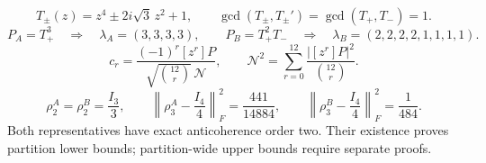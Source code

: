 \[
T_\pm(z)=z^4\pm2i\sqrt3\,z^2+1,
\qquad\gcd(T_\pm,T_\pm')=\gcd(T_+,T_-)=1.
\]
\[
P_A=T_+^3\quad\Longrightarrow\quad\lambda_A=(3,3,3,3),
\qquad
P_B=T_+^2T_-\quad\Longrightarrow\quad\lambda_B=(2,2,2,2,1,1,1,1).
\]
\[
c_r=\frac{(-1)^r[z^r]P}{\sqrt{\binom{12}{r}}\,\mathcal N},
\qquad\mathcal N^2=\sum_{r=0}^{12}\frac{|[z^r]P|^2}{\binom{12}{r}}.
\]
\[
\rho_2^A=\rho_2^B=\frac{I_3}{3},\qquad
\left\|\rho_3^A-\frac{I_4}{4}\right\|_F^2=\frac{441}{14884},\qquad
\left\|\rho_3^B-\frac{I_4}{4}\right\|_F^2=\frac1{484}.
\]
Both representatives have exact anticoherence order two. Their existence proves partition lower bounds; partition-wide upper bounds require separate proofs.
